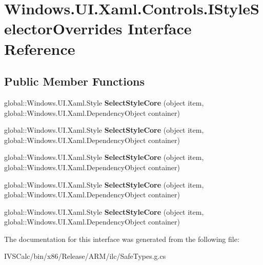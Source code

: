 \hypertarget{interface_windows_1_1_u_i_1_1_xaml_1_1_controls_1_1_i_style_selector_overrides}{}\section{Windows.\+U\+I.\+Xaml.\+Controls.\+I\+Style\+Selector\+Overrides Interface Reference}
\label{interface_windows_1_1_u_i_1_1_xaml_1_1_controls_1_1_i_style_selector_overrides}
\subsection*{Public Member Functions}
\begin{DoxyCompactItemize}
\item 
\mbox{\label{interface_windows_1_1_u_i_1_1_xaml_1_1_controls_1_1_i_style_selector_overrides_af130c74d158e06132d9548fe4e93529d}} 
global\+::\+Windows.\+U\+I.\+Xaml.\+Style {\bfseries Select\+Style\+Core} (object item, global\+::\+Windows.\+U\+I.\+Xaml.\+Dependency\+Object container)
\item 
\mbox{\label{interface_windows_1_1_u_i_1_1_xaml_1_1_controls_1_1_i_style_selector_overrides_af130c74d158e06132d9548fe4e93529d}} 
global\+::\+Windows.\+U\+I.\+Xaml.\+Style {\bfseries Select\+Style\+Core} (object item, global\+::\+Windows.\+U\+I.\+Xaml.\+Dependency\+Object container)
\item 
\mbox{\label{interface_windows_1_1_u_i_1_1_xaml_1_1_controls_1_1_i_style_selector_overrides_af130c74d158e06132d9548fe4e93529d}} 
global\+::\+Windows.\+U\+I.\+Xaml.\+Style {\bfseries Select\+Style\+Core} (object item, global\+::\+Windows.\+U\+I.\+Xaml.\+Dependency\+Object container)
\item 
\mbox{\label{interface_windows_1_1_u_i_1_1_xaml_1_1_controls_1_1_i_style_selector_overrides_af130c74d158e06132d9548fe4e93529d}} 
global\+::\+Windows.\+U\+I.\+Xaml.\+Style {\bfseries Select\+Style\+Core} (object item, global\+::\+Windows.\+U\+I.\+Xaml.\+Dependency\+Object container)
\item 
\mbox{\label{interface_windows_1_1_u_i_1_1_xaml_1_1_controls_1_1_i_style_selector_overrides_af130c74d158e06132d9548fe4e93529d}} 
global\+::\+Windows.\+U\+I.\+Xaml.\+Style {\bfseries Select\+Style\+Core} (object item, global\+::\+Windows.\+U\+I.\+Xaml.\+Dependency\+Object container)
\end{DoxyCompactItemize}


The documentation for this interface was generated from the following file\+:\begin{DoxyCompactItemize}
\item 
I\+V\+S\+Calc/bin/x86/\+Release/\+A\+R\+M/ilc/Safe\+Types.\+g.\+cs\end{DoxyCompactItemize}
